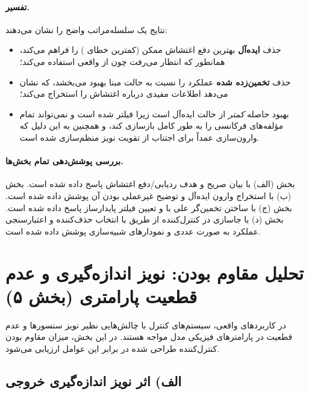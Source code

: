 \documentclass[a4paper]{article}
\begin{document}
\paragraph{تفسیر.}
نتایج یک سلسله‌مراتب واضح را نشان می‌دهند:
\begin{itemize}
	\item حذف \textbf{ایده‌آل} بهترین دفع اغتشاش ممکن (کمترین خطای ) را فراهم می‌کند، همانطور که انتظار می‌رفت چون از  واقعی استفاده می‌کند؛
	\item حذف \textbf{تخمین‌زده شده} عملکرد را نسبت به حالت مبنا بهبود می‌بخشد، که نشان می‌دهد  اطلاعات مفیدی درباره اغتشاش را استخراج می‌کند؛
	\item بهبود حاصله \emph{کمتر} از حالت ایده‌آل است زیرا  فیلتر شده است و نمی‌تواند تمام مؤلفه‌های فرکانسی  را به طور کامل بازسازی کند، و همچنین به این دلیل که وارون‌سازی عمداً برای اجتناب از تقویت نویز منظم‌سازی  شده است.
\end{itemize}

\paragraph{بررسی پوشش‌دهی تمام بخش‌ها.}
بخش (الف) با بیان صریح  و هدف ردیابی/دفع اغتشاش پاسخ داده شده است.
بخش (ب) با استخراج وارون ایده‌آل  و توضیح غیرعملی بودن آن پوشش داده شده است.
بخش (ج) با ساختن تخمین‌گر علی  با  و تعیین فیلتر پایدارساز  پاسخ داده شده است.
بخش (د) با جاسازی  در کنترل‌کننده از طریق  با انتخاب حذف‌کننده  و اعتبارسنجی عملکرد به صورت عددی و نمودارهای شبیه‌سازی پوشش داده شده است.
\newpage
\section{تحلیل مقاوم بودن: نویز اندازه‌گیری و عدم قطعیت پارامتری (بخش ۵)}

در کاربردهای واقعی، سیستم‌های کنترل با چالش‌هایی نظیر نویز سنسورها و عدم قطعیت در پارامترهای فیزیکی مدل مواجه هستند. در این بخش، میزان مقاوم بودن  کنترل‌کننده طراحی شده در برابر این عوامل ارزیابی می‌شود.

\subsection{الف) اثر نویز اندازه‌گیری خروجی }
\end{document}
